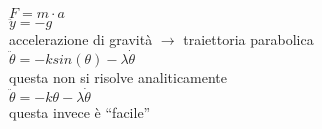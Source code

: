 \documentclass[11pt, a4paper]{article}
\begin{document}
\thispagestyle{empty}
\begin{center}
\Huge
$F=m\cdot a$\\
$ $\\
$\ddot{y}=-g$\\
\huge accelerazione di gravit\`a $\rightarrow$ traiettoria parabolica\\
\Huge
$ $\\
$\ddot{\theta} = -k sin(\theta)-\lambda\dot{\theta}$\\
questa non si risolve analiticamente\\
$ $\\
$\ddot{\theta} = -k \theta-\lambda\dot{\theta}$\\
questa invece \`e ``facile''\\
\end{center}
\end{document}
